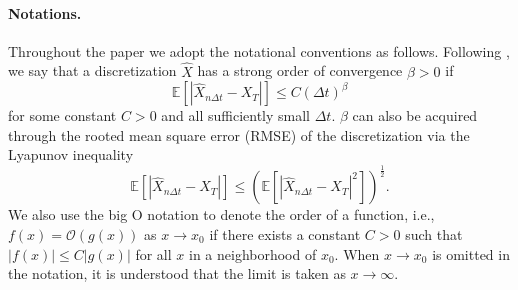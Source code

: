 \documentclass[11pt]{article}%
\theoremstyle{definition}
\begin{document}
\paragraph{Notations.} Throughout the paper we adopt the notational conventions as follows. Following \cite{Glasserman}, we say that a discretization \(\widehat{X}\) has a strong order of convergence \(\beta > 0\) if \[\mathbb{E}[|\widehat{X}_{n\Delta t} - X_T|] \le C (\Delta t)^{\beta}\] for some constant \(C > 0\) and all sufficiently small \(\Delta t\). \(\beta\) can also be acquired through the rooted mean square error (RMSE) of the discretization via the Lyapunov inequality \[\mathbb{E}[|\widehat{X}_{n\Delta t} - X_T|]  \le \left(\mathbb{E}[|\widehat{X}_{n\Delta t} - X_T|^2] \right)^{\frac{1}{2}}.\]
We also use the big O notation to denote the order of a function, i.e., \(f(x) = \mathcal{O}(g(x))\) as \(x\to x_0\) if there exists a constant \(C > 0\) such that \(|f(x)| \le C|g(x)|\) for all \(x\) in a neighborhood of \(x_0\). When \(x\to x_0\) is omitted in the notation, it is understood that the limit is taken as \(x\to \infty\).



\end{document}
